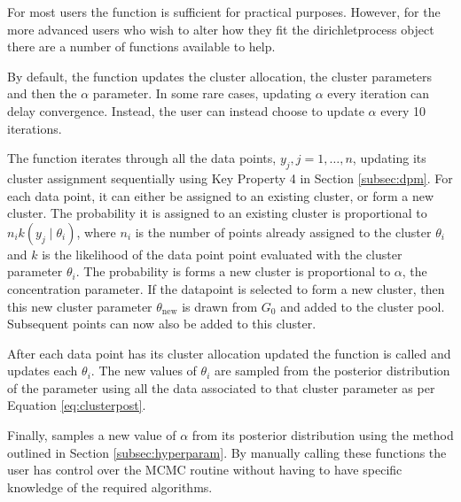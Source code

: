 \documentclass[nojss]{jss}
\begin{document}
For most users the  function is sufficient for practical purposes. However, for the more advanced users who wish to alter how they fit the dirichletprocess object there are a number of functions available to help.

By default, the  function updates the cluster allocation, the cluster parameters and then the $\alpha$ parameter. In some rare cases, updating $\alpha$ every iteration can delay convergence. Instead, the user can instead choose to update $\alpha$ every 10 iterations.
\begin{Schunk}
\end{Schunk}

The function  iterates through all the data points, $y_j, j=1,\ldots,n$, updating its cluster assignment sequentially using Key Property 4 in Section \ref{subsec:dpm}. For each data point, it can either be assigned to an existing cluster, or form a new cluster. The probability it is assigned to an existing cluster is proportional to $n_i k(y _j \mid \theta _{i})$, where $n_i$ is the number of points already assigned to the cluster $\theta _i$ and $k$ is the likelihood of the data point point evaluated with the cluster parameter $\theta _i$. The probability is forms a new cluster is proportional to $\alpha$, the concentration parameter. If the datapoint is selected to form a new cluster, then this new cluster parameter $\theta _{\text{new}}$ is drawn from $G_0$ and added to the cluster pool. Subsequent points can now also be added to this cluster.

After each data point has its cluster allocation updated the function  is called and updates each $\theta _i$. The new values of $\theta_i$ are sampled from the posterior distribution of the parameter using all the data associated to that cluster parameter as per Equation \eqref{eq:clusterpost}.

Finally,  samples a new value of $\alpha$ from its posterior distribution using the method outlined in Section \ref{subsec:hyperparam}. By manually calling these functions the user has control over the MCMC routine without having to have specific knowledge of the required algorithms.
\end{document}
